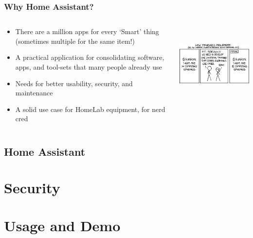 \documentclass[aspectratio=169]{beamer}
\begin{document}
\begin{frame}[fragile]
  \frametitle{Why Home Assistant?}
  \begin{columns}[]
    \begin{column}[T]{0.45\paperwidth}
      \begin{itemize}%
        \item{There are a million apps for every `Smart' thing (sometimes multiple for the same item!)}
        \item{A practical application for consolidating software, apps, and tool-sets that many people already use}
        \item{Needs for better usability, security, and maintenance}
        \item{A solid use case for HomeLab equipment, for nerd cred}
     \end{itemize}
    \end{column}
    \begin{column}[T]{0.45\paperwidth}
      \includegraphics[height=4cm,keepaspectratio]{images/standards.png}
    \end{column}
  \end{columns}
\end{frame}

\subsection{Home Assistant}
\frame{\subsectionpage}


\section{Security}
\frame{\sectionpage}

\section{Usage and Demo}
\frame{\sectionpage}

\end{document}
